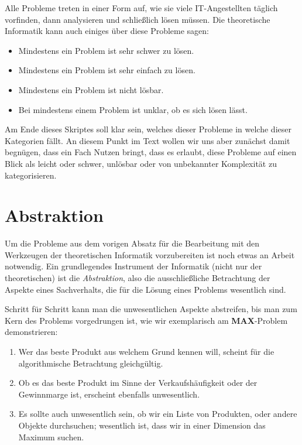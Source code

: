 Alle Probleme treten in einer Form auf,
wie sie viele IT-Angestellten täglich vorfinden, dann analysieren und schließlich lösen müssen.
Die theoretische Informatik kann auch einiges über diese Probleme sagen:
\begin{itemize}
    \item Mindestens ein Problem ist sehr schwer zu lösen.
    \item Mindestens ein Problem ist sehr einfach zu lösen.
    \item Mindestens ein Problem ist nicht lösbar.
    \item Bei mindestens einem Problem ist unklar, ob es sich lösen lässt.
\end{itemize}

Am Ende dieses Skriptes soll klar sein, welches dieser Probleme in welche dieser Kategorien fällt.
An diesem Punkt im Text wollen wir uns aber zunächst damit begnügen,
dass ein Fach Nutzen bringt, dass es erlaubt, diese Probleme auf einen Blick als leicht oder
schwer, unlösbar oder von unbekannter Komplexität zu kategorisieren.

\section{Abstraktion}

Um die Probleme aus dem vorigen Absatz für die Bearbeitung mit den Werkzeugen der
theoretischen Informatik vorzubereiten ist noch etwas an Arbeit notwendig.
Ein grundlegendes Instrument der Informatik (nicht nur der theoretischen) 
ist die \emph{Abstraktion}, also die ausschließliche Betrachtung der Aspekte eines Sachverhalts,
die für die Lösung eines Problems wesentlich sind.

Schritt für Schritt kann man die unwesentlichen Aspekte abstreifen,
bis man zum Kern des Problems vorgedrungen ist,
wie wir exemplarisch am \textbf{MAX}-Problem demonstrieren:

\begin{enumerate}
    \item Wer das beste Produkt aus welchem Grund kennen will,
    scheint für die algorithmische Betrachtung gleichgültig.
    \item Ob es das beste Produkt im Sinne der Verkaufshäufigkeit oder der Gewinnmarge ist,
    erscheint ebenfalls unwesentlich.
    \item Es sollte auch unwesentlich sein, ob wir ein Liste von Produkten,
    oder andere Objekte durchsuchen; wesentlich ist,
    dass wir in einer Dimension das Maximum suchen.
\end{enumerate}

